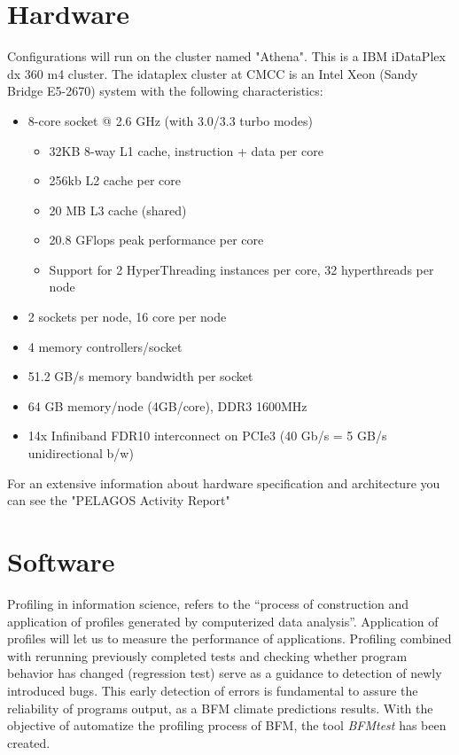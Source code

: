 
\section{Hardware}\label{sec:hardware}

Configurations will run on the cluster named "Athena". This is a IBM iDataPlex dx 360 m4 cluster. The idataplex cluster at CMCC is an Intel Xeon (Sandy Bridge E5-2670) system with the following characteristics:
\begin{itemize}
\item 8-core socket @ 2.6 GHz (with 3.0/3.3 turbo modes)
\begin{itemize}
\item 32KB 8-way L1 cache, instruction + data per core
\item 256kb L2 cache per core
\item 20 MB L3 cache (shared)
\item 20.8 GFlops peak performance per core
\item Support for 2 HyperThreading instances per core, 32 hyperthreads per node 
\end{itemize}
\item 2 sockets per node, 16 core per node
\item 4 memory controllers/socket
\item 51.2 GB/s memory bandwidth per socket
\item 64 GB memory/node (4GB/core), DDR3 1600MHz
\item 14x Infiniband FDR10 interconnect on PCIe3 (40 Gb/s = 5 GB/s unidirectional b/w)
\end{itemize}

For an extensive information about hardware specification and architecture you can see the "PELAGOS Activity Report"\cite{brunson_report} 

\section{Software}\label{sec:software}

Profiling in information science, refers to the ``process of construction and application of profiles generated by computerized data analysis''. Application of profiles will let us to measure the performance of applications. Profiling combined with rerunning previously completed tests and checking whether program behavior has changed (regression test) serve as a guidance to detection of newly introduced bugs. This early detection of errors is fundamental to assure the reliability of programs output, as a BFM climate predictions results. With the objective of automatize the profiling process of BFM, the tool {\it BFMtest} has been created.

